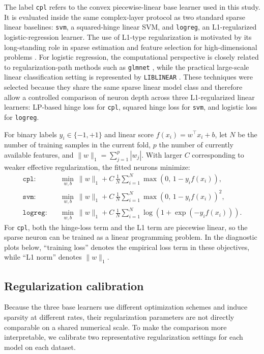 The label \texttt{cpl} refers to the convex piecewise-linear base learner used in this study. It is evaluated
inside the same complex-layer protocol as two standard sparse linear baselines: \texttt{svm}, a squared-hinge
linear SVM, and \texttt{logreg}, an L1-regularized logistic-regression learner.
The use of L1-type regularization is motivated by its long-standing role in sparse estimation and feature
selection for high-dimensional problems \cite{tibshirani1996lasso,ng2004l1l2}. For logistic regression, the
computational perspective is closely related to regularization-path methods such as \texttt{glmnet}
\cite{friedman2010glmnet}, while the practical large-scale linear classification setting is represented by
\texttt{LIBLINEAR} \cite{fan2008liblinear}.
These techniques were selected because they share the same sparse linear model class and therefore allow a
controlled comparison of neuron depth across three L1-regularized linear learners: LP-based hinge loss for
\texttt{cpl}, squared hinge loss for \texttt{svm}, and logistic loss for \texttt{logreg}.

For binary labels $y_i \in \{-1,+1\}$ and linear score $f(x_i)=w^\top x_i + b$, let $N$ be the number of
training samples in the current fold, $p$ the number of currently available features, and
$\lVert w\rVert_1=\sum_{j=1}^{p}|w_j|$. With larger $C$ corresponding to weaker effective regularization, the
fitted neurons minimize:
\[
\begin{aligned}
\texttt{cpl}:&\quad \min_{w,b}\ \lVert w\rVert_1
    + C\,\frac{1}{N}\sum_{i=1}^{N}\max\!\left(0,\,1-y_i f(x_i)\right),\\
\texttt{svm}:&\quad \min_{w,b}\ \lVert w\rVert_1
    + C\,\frac{1}{N}\sum_{i=1}^{N}\max\!\left(0,\,1-y_i f(x_i)\right)^2,\\
\texttt{logreg}:&\quad \min_{w,b}\ \lVert w\rVert_1
    + C\,\frac{1}{N}\sum_{i=1}^{N}\log\!\left(1+\exp(-y_i f(x_i))\right).
\end{aligned}
\]
For \texttt{cpl}, both the hinge-loss term and the L1 term are piecewise linear, so the sparse neuron can be
trained as a linear programming problem. In the diagnostic plots below, ``training loss'' denotes the empirical
loss term in these objectives, while ``L1 norm'' denotes $\lVert w\rVert_1$.

\subsection*{Regularization calibration}
Because the three base learners use different optimization schemes and induce sparsity at different rates,
their regularization parameters are not directly comparable on a shared numerical scale. To make the comparison
more interpretable, we calibrate two representative regularization settings for each model on each dataset.

